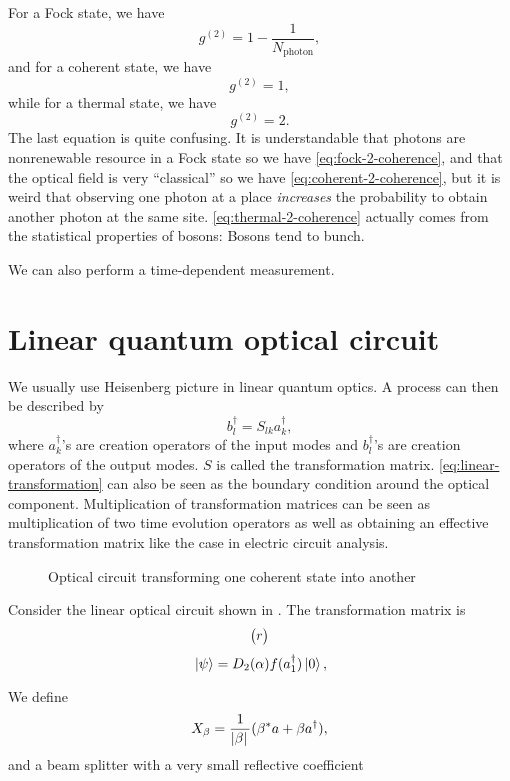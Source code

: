 \documentclass[hyperref, a4paper]{article}
\begin{document}
For a Fock state, we have 
\begin{equation}
    g^{(2)} = 1 - \frac{1}{N_\text{photon}},
    \label{eq:fock-2-coherence}
\end{equation}
and for a coherent state, we have 
\begin{equation}
    g^{(2)} = 1,
    \label{eq:coherent-2-coherence}
\end{equation}
while for a thermal state, we have 
\begin{equation}
    g^{(2)} = 2.
    \label{eq:thermal-2-coherence}
\end{equation}
The last equation is quite confusing. It is understandable that photons are nonrenewable resource in a Fock state so we have \eqref{eq:fock-2-coherence}, and that the optical field is very ``classical'' so we have \eqref{eq:coherent-2-coherence}, 
but it is weird that observing one photon at a place \emph{increases} the probability to obtain another photon at the same site.
\eqref{eq:thermal-2-coherence} actually comes from the statistical properties of bosons: Bosons tend to bunch.

We can also perform a time-dependent measurement. 

\section{Linear quantum optical circuit}

We usually use Heisenberg picture in linear quantum optics. A process can then be described by 
\begin{equation}
    b_l^\dagger = S_{lk} a^\dagger_k,
    \label{eq:linear-transformation}
\end{equation}
where $a^\dagger_k$'s are creation operators of the input modes and $b^\dagger_l$'s are creation operators of the output modes.
$S$ is called the transformation matrix.
\eqref{eq:linear-transformation} can also be seen as the boundary condition around the optical component.
Multiplication of transformation matrices can be seen as multiplication of two time evolution operators as well as obtaining an effective transformation matrix like the case in electric circuit analysis.

\begin{figure}
    \centering
    
    \caption{Optical circuit transforming one coherent state into another}
    \label{fig:coherent-move}
\end{figure}

Consider the linear optical circuit shown in .
The transformation matrix is 
\begin{equation}
    \pmqty{r}
\end{equation}
\[
    \ket*{\psi} = D_2(\alpha) f(a_1^\dagger) \ket*{0},
\]

We define 
\begin{equation}
    X_\beta = \frac{1}{\abs*{\beta}} (\beta^* a + \beta a^\dagger),
\end{equation}
and a beam splitter with a very small reflective coefficient 
\end{document}
